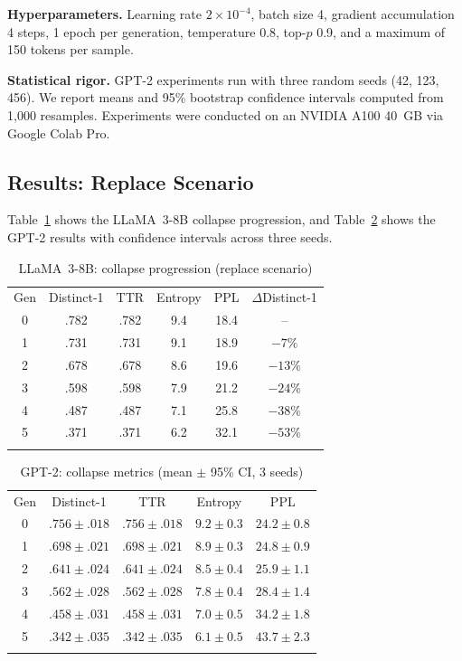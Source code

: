 \documentclass{svproc}
\newcommand{\dist}[1]{Distinct-#1}
\begin{document}
\noindent\textbf{Hyperparameters.} Learning rate $2\times10^{-4}$, batch size 4,
gradient accumulation 4 steps, 1 epoch per generation, temperature 0.8, top-$p$
0.9, and a maximum of 150 tokens per sample.

\noindent\textbf{Statistical rigor.} GPT-2 experiments run with three random seeds
(42, 123, 456). We report means and 95\% bootstrap confidence intervals computed
from 1{,}000 resamples. Experiments were conducted on an NVIDIA A100 40~GB via
Google Colab Pro.

\subsection{Results: Replace Scenario}
Table~\ref{tab:llama} shows the LLaMA~3-8B collapse progression, and
Table~\ref{tab:gpt2} shows the GPT-2 results with confidence intervals across
three seeds.

\begin{table}[t]
\centering
\caption{LLaMA~3-8B: collapse progression (replace scenario)}
\label{tab:llama}
\begin{tabular}{cccccc}
\hline\noalign{\smallskip}
Gen & \dist{1} & TTR & Entropy & PPL & $\Delta$\dist{1} \\
\noalign{\smallskip}\hline\noalign{\smallskip}
0 & .782 & .782 & 9.4 & 18.4 & --      \\
1 & .731 & .731 & 9.1 & 18.9 & $-7\%$  \\
2 & .678 & .678 & 8.6 & 19.6 & $-13\%$ \\
3 & .598 & .598 & 7.9 & 21.2 & $-24\%$ \\
4 & .487 & .487 & 7.1 & 25.8 & $-38\%$ \\
5 & .371 & .371 & 6.2 & 32.1 & $-53\%$ \\
\noalign{\smallskip}\hline
\end{tabular}
\end{table}

\begin{table}[t]
\centering
\caption{GPT-2: collapse metrics (mean $\pm$ 95\% CI, 3 seeds)}
\label{tab:gpt2}
\begin{tabular}{ccccc}
\hline\noalign{\smallskip}
Gen & \dist{1} & TTR & Entropy & PPL \\
\noalign{\smallskip}\hline\noalign{\smallskip}
0 & $.756\pm.018$ & $.756\pm.018$ & $9.2\pm0.3$ & $24.2\pm0.8$ \\
1 & $.698\pm.021$ & $.698\pm.021$ & $8.9\pm0.3$ & $24.8\pm0.9$ \\
2 & $.641\pm.024$ & $.641\pm.024$ & $8.5\pm0.4$ & $25.9\pm1.1$ \\
3 & $.562\pm.028$ & $.562\pm.028$ & $7.8\pm0.4$ & $28.4\pm1.4$ \\
4 & $.458\pm.031$ & $.458\pm.031$ & $7.0\pm0.5$ & $34.2\pm1.8$ \\
5 & $.342\pm.035$ & $.342\pm.035$ & $6.1\pm0.5$ & $43.7\pm2.3$ \\
\noalign{\smallskip}\hline
\end{tabular}
\end{table}
\end{document}
